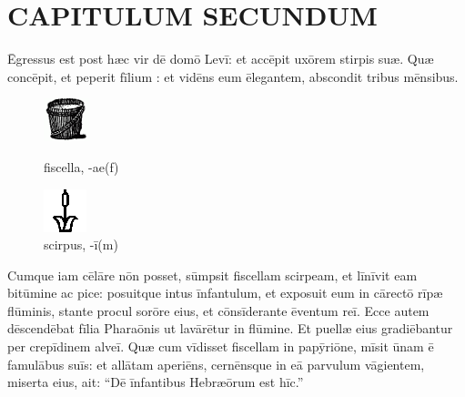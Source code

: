\chapter{CAPITULUM SECUNDUM}

Ēgressus est post hæc vir dē domō Levī: et accēpit uxōrem stirpis suæ.
Quæ concēpit, et peperit fīlium : et vidēns eum ēlegantem, abscondit tribus mēnsibus.

\begin{figure}[hp]
    \begin{minipage}[hbp]{0.5\linewidth}
        \centering
        \includegraphics{fisc}
        \caption{fiscella, -ae(f)}
    \end{minipage}%
    \begin{minipage}[hbp]{0.5\linewidth}
        \centering
        \includegraphics{brush}
        \caption{scirpus, -ī(m)}
    \end{minipage}
\end{figure}

Cumque iam cēlāre nōn posset, sūmpsit fiscellam scirpeam,
et līnīvit eam bitūmine ac pice:
posuitque intus īnfantulum, et exposuit eum in cārectō rīpæ flūminis,
stante procul sorōre eius, et cōnsīderante ēventum reī.
Ecce autem dēscendēbat fīlia Pharaōnis ut lavārētur in flūmine. Et puellæ eius gradiēbantur per crepīdinem alveī.
Quæ cum vīdisset fiscellam in papȳriōne,
mīsit ūnam ē famulābus suīs: et allātam aperiēns,
cernēnsque in eā parvulum vāgientem,
miserta eius, ait: ``Dē īnfantibus Hebræōrum est hīc.''

